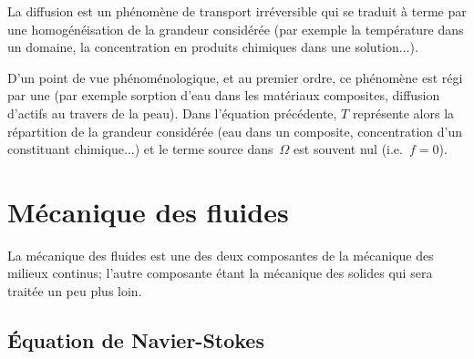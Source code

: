 La diffusion est un phénomène de transport irréversible qui se traduit à terme
par une homogénéisation de la grandeur considérée (par exemple la température
dans un domaine, la concentration en produits chimiques dans une solution...).

D'un point de vue phénoménologique, et au premier ordre, ce phénomène est régi par une 
 (par exemple sorption d'eau dans les matériaux composites, diffusion d'actifs au travers
de la peau).
Dans l'équation précédente, $T$ représente alors la répartition de la grandeur
considérée (eau dans un composite, concentration d'un constituant chimique...) et 
le terme source dans~$\Omega$ est souvent nul (i.e.~$f=0$).





\medskip
\section{Mécanique des fluides}
La mécanique des fluides est une des deux composantes de la mécanique des milieux continus;
l'autre composante étant la mécanique des solides qui sera traitée un peu plus loin.





\medskip
\subsection{Équation de Navier-Stokes}

